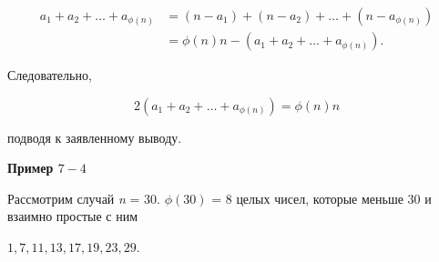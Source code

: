 \documentclass[11pt]{article}
\begin{document}
\begin{align*}
a_1  + a_2 +  \ldots  + a_{\phi(n)} & = (n - a_1) + (n - a_2) + \ldots + (n - a_{\phi(n)}) \\
& = \phi(n)n - (a_1  + a_2 + \ldots  + a_{\phi(n)}).
\end{align*}

Следовательно, 

\[
2( a_1 + a_2 + \ldots + a_{\phi(n)} )= \phi(n) n
\]


подводя к заявленному выводу.

\begin{flushleft}
	\textbf{Пример $7-4$}
\end{flushleft}



Рассмотрим случай \textit{n} = $30$. $\phi(30)$ = $8$ целых чисел, которые меньше $30$ и взаимно простые с ним

\begin{center}
	$1, 7, 11, 13, 17, 19, 23, 29$.
\end{center}
\end{document}
